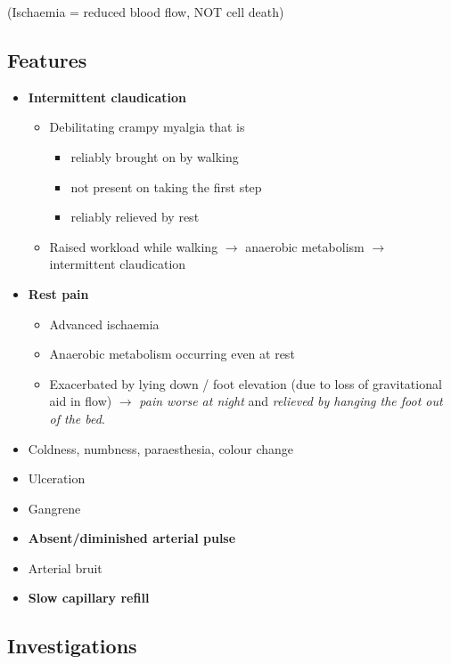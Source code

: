 \documentclass[
  14pt,
]{memoir}
\providecommand{\tightlist}{%
  \setlength{\itemsep}{0pt}\setlength{\parskip}{0pt}}
\begin{document}
(Ischaemia = reduced blood flow, NOT cell death)

\hypertarget{features-3}{%
\subsection{Features}\label{features-3}}

\begin{itemize}
\tightlist
\item
  \textbf{Intermittent claudication}

  \begin{itemize}
  \tightlist
  \item
    Debilitating crampy myalgia that is

    \begin{itemize}
    \tightlist
    \item
      reliably brought on by walking
    \item
      not present on taking the first step
    \item
      reliably relieved by rest
    \end{itemize}
  \item
    Raised workload while walking \(\rightarrow\) anaerobic metabolism
    \(\rightarrow\) intermittent claudication
  \end{itemize}
\item
  \textbf{Rest pain}

  \begin{itemize}
  \tightlist
  \item
    Advanced ischaemia
  \item
    Anaerobic metabolism occurring even at rest
  \item
    Exacerbated by lying down / foot elevation (due to loss of
    gravitational aid in flow) \(\rightarrow\) \emph{pain worse at
    night} and \emph{relieved by hanging the foot out of the bed}.
  \end{itemize}
\item
  Coldness, numbness, paraesthesia, colour change
\item
  Ulceration
\item
  Gangrene
\item
  \textbf{Absent/diminished arterial pulse}
\item
  Arterial bruit
\item
  \textbf{Slow capillary refill}
\end{itemize}

\hypertarget{investigations-2}{%
\subsection{Investigations}\label{investigations-2}}
\end{document}
